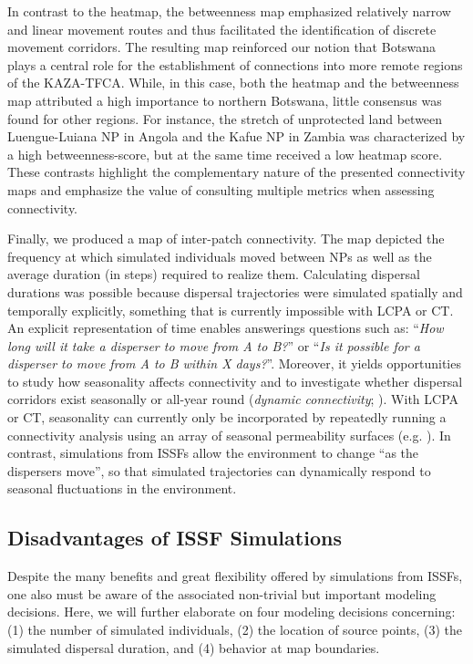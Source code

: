 \documentclass[abstract=on,10pt,a4paper,bibliography=totocnumbered]{article}
\begin{document}
In contrast to the heatmap, the betweenness map emphasized relatively narrow and
linear movement routes and thus facilitated the identification of discrete
movement corridors. The resulting map reinforced our notion that Botswana plays
a central role for the establishment of connections into more remote regions of
the KAZA-TFCA. While, in this case, both the heatmap and the betweenness map
attributed a high importance to northern Botswana, little consensus was found
for other regions. For instance, the stretch of unprotected land between
Luengue-Luiana NP in Angola and the Kafue NP in Zambia was characterized by a
high betweenness-score, but at the same time received a low heatmap score. These
contrasts highlight the complementary nature of the presented connectivity maps
and emphasize the value of consulting multiple metrics when assessing
connectivity.

Finally, we produced a map of inter-patch connectivity. The map depicted the
frequency at which simulated individuals moved between NPs as well as the
average duration (in steps) required to realize them. Calculating dispersal
durations was possible because dispersal trajectories were simulated spatially
and temporally explicitly, something that is currently impossible with LCPA or
CT. An explicit representation of time enables answerings questions such as:
``\textit{How long will it take a disperser to move from A to B?}'' or
``\textit{Is it possible for a disperser to move from A to B within X days?}''.
Moreover, it yields opportunities to study how seasonality affects connectivity
and to investigate whether dispersal corridors exist seasonally or all-year
round (\textit{dynamic connectivity}; \citealp{Zeller.2020}). With LCPA or CT,
seasonality can currently only be incorporated by repeatedly running a
connectivity analysis using an array of seasonal permeability surfaces (e.g.
\citealp{Benz.2016, Osipova.2019}). In contrast, simulations from ISSFs allow
the environment to change ``as the dispersers move'', so that simulated
trajectories can dynamically respond to seasonal fluctuations in the
environment.

\subsection{Disadvantages of ISSF Simulations}
Despite the many benefits and great flexibility offered by simulations from
ISSFs, one also must be aware of the associated non-trivial but important
modeling decisions. Here, we will further elaborate on four modeling decisions
concerning: (1) the number of simulated individuals, (2) the location of source
points, (3) the simulated dispersal duration, and (4) behavior at map
boundaries.
\end{document}
